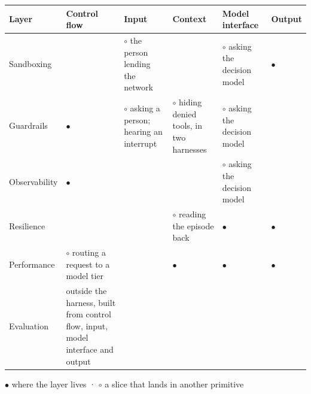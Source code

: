{\def\LTcaptype{none} 
\begin{longtable}[]{@{}
  >{\raggedright\arraybackslash}p{}
  >{\centering\arraybackslash}p{}
  >{\centering\arraybackslash}p{}
  >{\centering\arraybackslash}p{}
  >{\centering\arraybackslash}p{}
  >{\centering\arraybackslash}p{}@{}}
\toprule\noalign{}
\begin{minipage}[b]{\linewidth}\raggedright
Layer
\end{minipage} & \begin{minipage}[b]{\linewidth}\centering
Control flow
\end{minipage} & \begin{minipage}[b]{\linewidth}\centering
Input
\end{minipage} & \begin{minipage}[b]{\linewidth}\centering
Context
\end{minipage} & \begin{minipage}[b]{\linewidth}\centering
Model interface
\end{minipage} & \begin{minipage}[b]{\linewidth}\centering
Output
\end{minipage} \\
\midrule\noalign{}
\endhead
\bottomrule\noalign{}
\endlastfoot
Sandboxing & & \(\circ\) the person lending the network & & \(\circ\) asking the decision model & \(\bullet\) \\
Guardrails & \(\bullet\) & \(\circ\) asking a person; hearing an interrupt & \(\circ\) hiding denied tools, in two harnesses & \(\circ\) asking the decision model & \\
Observability & \(\bullet\) & & & \(\circ\) asking the decision model & \\
Resilience & & & \(\circ\) reading the episode back & \(\bullet\) & \(\bullet\) \\
Performance & \(\circ\) routing a request to a model tier & & \(\bullet\) & \(\bullet\) & \(\bullet\) \\
Evaluation & outside the harness, built from control flow, input, model interface and output & & & & \\
\end{longtable}
}

\(\bullet\) where the layer lives · \(\circ\) a slice that lands in another primitive
